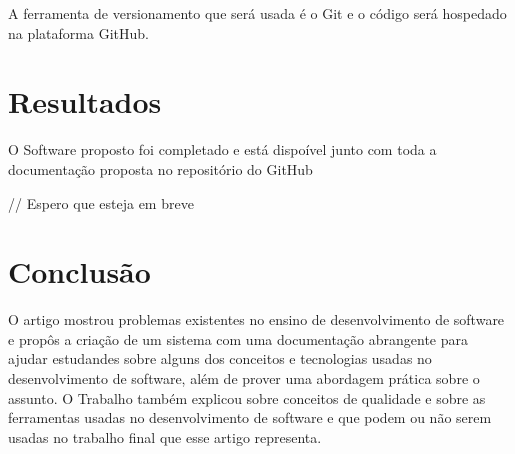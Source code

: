 \documentclass[12pt]{article}
\begin{document}
A ferramenta de versionamento que será usada é o Git e o código será hospedado na plataforma GitHub.

\section{Resultados}

O Software proposto foi completado e está dispoível junto com toda a documentação proposta no
repositório do GitHub

// Espero que esteja em breve

\section{Conclusão}

O artigo mostrou problemas existentes no ensino de desenvolvimento de software e propôs
a criação de um sistema com uma documentação abrangente para ajudar estudandes sobre alguns dos
conceitos e tecnologias usadas no desenvolvimento de software, além de prover uma abordagem prática
sobre o assunto. O Trabalho também explicou sobre conceitos de qualidade e sobre as ferramentas usadas
no desenvolvimento de software e que podem ou não serem usadas no trabalho final
que esse artigo representa.


\end{document}
